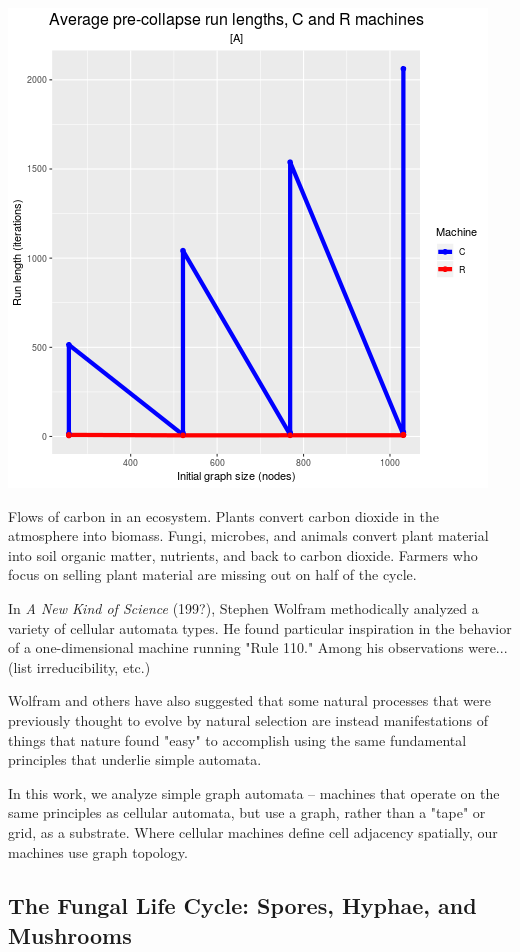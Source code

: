 \documentclass{tufte-handout}
\begin{document}
\begin{marginfigure}
\includegraphics{figA.png}
\caption{Flows of carbon in an ecosystem.
Plants convert carbon dioxide in the atmosphere into biomass. Fungi, microbes, and animals convert plant material into soil organic matter, nutrients, and back to carbon dioxide.
Farmers who focus on selling plant material are missing out on half of the cycle.}
\end{marginfigure}

In \textit{A New Kind of Science} (199?), Stephen Wolfram methodically analyzed
a variety of cellular automata types. He found particular inspiration in the
behavior of a one-dimensional machine running "Rule 110." Among his observations were... (list
irreducibility, etc.)

Wolfram and others have also suggested that some natural processes that were
previously thought to evolve by natural selection are instead
manifestations of things that nature found "easy" to accomplish using
the same fundamental principles that underlie simple automata.

In this work, we analyze simple graph automata -- machines that operate on the same principles as
cellular automata, but use a graph, rather than a "tape" or grid, as a substrate.
Where cellular machines define cell adjacency spatially, our machines use graph topology.

\subsection{The Fungal Life Cycle: Spores, Hyphae, and Mushrooms}
\end{document}
